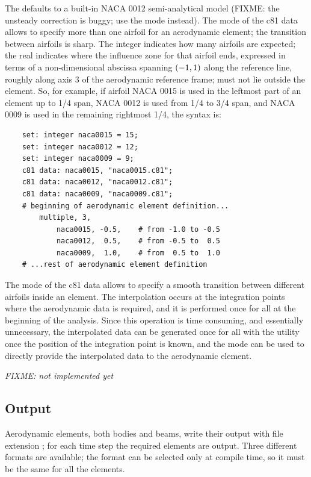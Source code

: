 The  defaults to a built-in NACA 0012 semi-analytical
model (FIXME: the unsteady correction is buggy; use the  
mode instead).
The  mode of the c81 data allows to specify
more than one airfoil for an aerodynamic element; the transition
between airfoils is sharp.
The integer  indicates how many airfoils are expected;
the real  indicates where the influence zone for that
airfoil ends, expressed in terms of a non-dimensional abscissa spanning 
$\left( -1,1 \right)$ along the reference line, roughly along axis 3 
of the aerodynamic reference frame;  must not lie outside
the element.
So, for example, if airfoil NACA 0015 is used in the leftmost part
of an element up to 1/4 span, NACA 0012 is used from 1/4 to 3/4 span,
and NACA 0009 is used in the remaining rightmost 1/4, the syntax is:
\begin{verbatim}
    set: integer naca0015 = 15;
    set: integer naca0012 = 12;
    set: integer naca0009 = 9;
    c81 data: naca0015, "naca0015.c81";
    c81 data: naca0012, "naca0012.c81";
    c81 data: naca0009, "naca0009.c81";
    # beginning of aerodynamic element definition...
        multiple, 3,
            naca0015, -0.5,    # from -1.0 to -0.5
            naca0012,  0.5,    # from -0.5 to  0.5
            naca0009,  1.0,    # from  0.5 to  1.0
    # ...rest of aerodynamic element definition
\end{verbatim}
The  mode of the c81 data allows to specify 
a smooth transition between different airfoils inside an element.
The interpolation occurs at the integration points where the
aerodynamic data is required, and it is performed once for all
at the beginning of the analysis.
Since this operation is time consuming, and essentially unnecessary,
the interpolated data can be generated once for all with the utility
 once the position of the integration point is known,
and the  mode can be used to directly provide
the interpolated data to the aerodynamic element.

\noindent
\emph{FIXME: not implemented yet}


\subsection{Output}
Aerodynamic elements, both bodies and beams, write their output with file
extension ; for each time step the required elements are output.
Three different formats are available; the format can be selected only at
compile time, so it must be the same for all the elements. 

